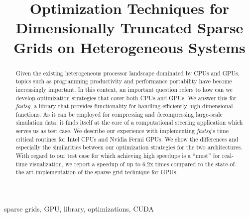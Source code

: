 \documentclass[10pt,conference,letterpaper]{IEEEtran}
\begin{document}
\title{Optimization Techniques for Dimensionally Truncated Sparse Grids on
Heterogeneous Systems}
\author{
\and
{}
}

\maketitle

\begin{abstract}
Given the existing heterogeneous processor landscape dominated by CPUs and GPUs,
topics such as programming productivity and performance portability have become
increasingly important. In this context, an important question refers to how can
we develop optimization strategies that cover both CPUs and GPUs. We answer this
for \textit{fastsg}, a library that provides functionality for handling
efficiently high-dimensional functions. As it can be employed for compressing
and decompressing large-scale simulation data, it finds itself at the core of a
computational steering application which serves us as test case. We describe our
experience with implementing \textit{fastsg}'s time critical routines for Intel
CPUs and Nvidia Fermi GPUs. We show the differences and especially the
similarities between our optimization strategies for the two architectures. With
regard to our test case for which achieving high speedups is a ``must'' for
real-time visualization, we report a speedup of up to 6.2x times compared to the
state-of-the-art implementation of the sparse grid technique for GPUs.
\end{abstract}

\begin{IEEEkeywords}
sparse grids, GPU, library, optimizations, CUDA
\end{IEEEkeywords}



















\end{document}
